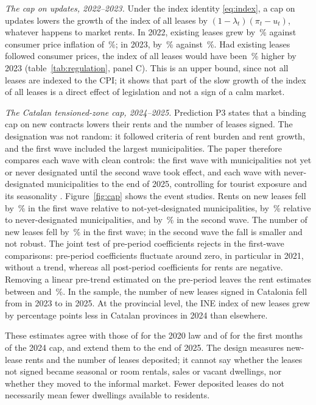 \documentclass[11pt,a4paper]{article}
\begin{document}
\textit{The cap on updates, 2022--2023.} Under the index identity \eqref{eq:index}, a cap on updates lowers the growth of the index of all leases by $(1-\lambda_t)(\pi_t-u_t)$, whatever happens to market rents. In 2022, existing leases grew by \gExisttwotwo\,\% against consumer price inflation of \cpiYtwotwo\,\%; in 2023, by \gExisttwothree\,\% against \cpiYtwothree\,\%. Had existing leases followed consumer prices, the index of all leases would have been \capGap\,\% higher by 2023 (table~\ref{tab:regulation}, panel C). This is an upper bound, since not all leases are indexed to the CPI; it shows that part of the slow growth of the index of all leases is a direct effect of legislation and not a sign of a calm market.

\textit{The Catalan tensioned-zone cap, 2024--2025.} Prediction P3 states that a binding cap on new contracts lowers their rents and the number of leases signed. The designation was not random: it followed criteria of rent burden and rent growth, and the first wave included the largest municipalities. The paper therefore compares each wave with clean controls: the first wave with municipalities not yet or never designated until the second wave took effect, and each wave with never-designated municipalities to the end of 2025, controlling for tourist exposure and its seasonality \citep{callaway2021,roth2023}. Figure~\ref{fig:cap} shows the event studies. Rents on new leases fell by \capROne\,\% in the first wave relative to not-yet-designated municipalities, by \capROneNever\,\% relative to never-designated municipalities, and by \capRTwo\,\% in the second wave. The number of new leases fell by \capNOne\,\% in the first wave; in the second wave the fall is smaller and not robust. The joint test of pre-period coefficients rejects in the first-wave comparisons: pre-period coefficients fluctuate around zero, in particular in 2021, without a trend, whereas all post-period coefficients for rents are negative. Removing a linear pre-trend estimated on the pre-period leaves the rent estimates between \capRdOne{} and \capRdTwo\,\%. In the sample, the number of new leases signed in Catalonia fell from \catLeasesTwentyThree{} in 2023 to \catLeasesTwentyFive{} in 2025. At the provincial level, the INE index of new leases grew by \provNew{} percentage points less in Catalan provinces in 2024 than elsewhere.

These estimates agree with those of \citet{jofre2023} for the 2020 law and of \citet{perez2026} for the first months of the 2024 cap, and extend them to the end of 2025. The design measures new-lease rents and the number of leases deposited; it cannot say whether the leases not signed became seasonal or room rentals, sales or vacant dwellings, nor whether they moved to the informal market. Fewer deposited leases do not necessarily mean fewer dwellings available to residents.
\end{document}
